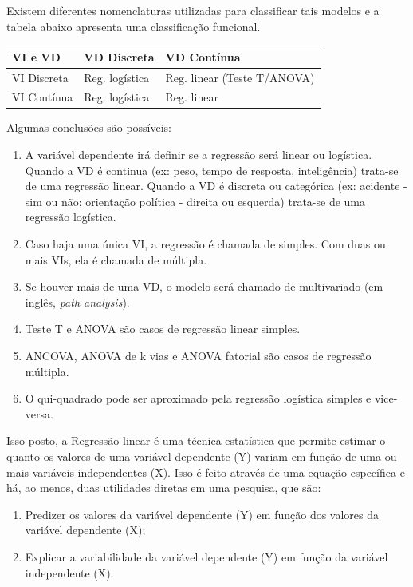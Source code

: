 \documentclass[
]{book}
\providecommand{\tightlist}{%
  \setlength{\itemsep}{0pt}\setlength{\parskip}{0pt}}
\begin{document}
Existem diferentes nomenclaturas utilizadas para classificar tais modelos e a tabela abaixo apresenta uma classificação funcional.

\begin{longtable}[]{@{}lll@{}}
\toprule
VI e VD & VD Discreta & VD Contínua \\
\midrule
\endhead
VI Discreta & Reg. logística & Reg. linear (Teste T/ANOVA) \\
VI Contínua & Reg. logística & Reg. linear \\
\bottomrule
\end{longtable}

Algumas conclusões são possíveis:

\begin{enumerate}
\def\labelenumi{\arabic{enumi}.}
\tightlist
\item
  A variável dependente irá definir se a regressão será linear ou logística. Quando a VD é continua (ex: peso, tempo de resposta, inteligência) trata-se de uma regressão linear. Quando a VD é discreta ou categórica (ex: acidente - sim ou não; orientação política - direita ou esquerda) trata-se de uma regressão logística.\\
\item
  Caso haja uma única VI, a regressão é chamada de simples. Com duas ou mais VIs, ela é chamada de múltipla.\\
\item
  Se houver mais de uma VD, o modelo será chamado de multivariado (em inglês, \emph{path analysis}).\\
\item
  Teste T e ANOVA são casos de regressão linear simples.\\
\item
  ANCOVA, ANOVA de k vias e ANOVA fatorial são casos de regressão múltipla.\\
\item
  O qui-quadrado pode ser aproximado pela regressão logística simples e vice-versa.
\end{enumerate}

Isso posto, a Regressão linear é uma técnica estatística que permite estimar o quanto os valores de uma variável dependente (Y) variam em função de uma ou mais variáveis independentes (X). Isso é feito através de uma equação específica e há, ao menos, duas utilidades diretas em uma pesquisa, que são:

\begin{enumerate}
\def\labelenumi{(\roman{enumi})}
\tightlist
\item
  Predizer os valores da variável dependente (Y) em função dos valores da variável dependente (X);\\
\item
  Explicar a variabilidade da variável dependente (Y) em função da variável independente (X).
\end{enumerate}
\end{document}
